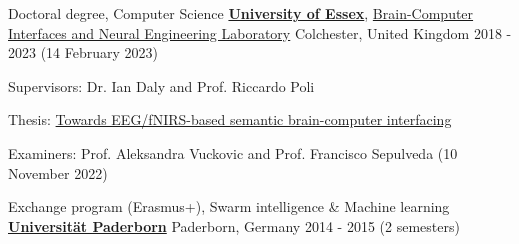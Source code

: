 

\begin{cventries}

  \cventry
    {Doctoral degree, Computer Science} %
    {\href{https://www.essex.ac.uk}{\textbf{University of Essex}}, \href{http://essexbcis.uk}{Brain-Computer Interfaces and Neural Engineering Laboratory}} %
    {Colchester, United Kingdom} %
    {2018 - 2023 (14 February 2023)} %
    {
      \begin{cvitems} %
        \item {Supervisors: Dr. Ian Daly and Prof. Riccardo Poli}
        \item {Thesis: \href{http://milanrybar.cz/semantic-brain-computer-interfacing}{Towards EEG/fNIRS-based semantic brain-computer interfacing}}
        \item {Examiners: Prof. Aleksandra Vuckovic and Prof. Francisco Sepulveda (10 November 2022)}
      \end{cvitems}
    }

  \cventry
{Exchange program (Erasmus+), Swarm intelligence \& Machine learning} %
{\href{http://www.uni-paderborn.de}{\textbf{Universität Paderborn}}} %
{Paderborn, Germany} %
{2014 - 2015 (2 semesters)} %
{
}


\end{cventries}
